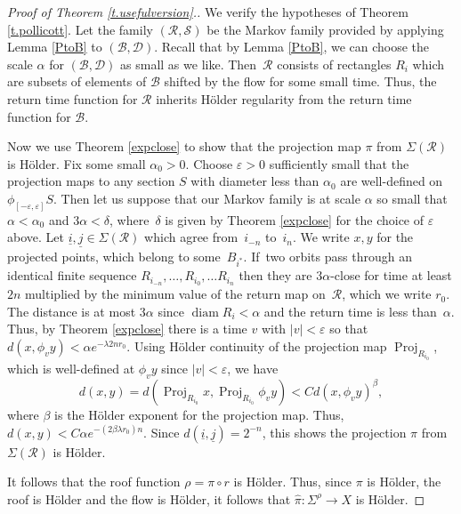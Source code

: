 \documentclass[11pt]{article}
\let\mathcal\mathscr
\let\epsilon\varepsilon
\theoremstyle{definition}
\numberwithin{equation}{section}
\DeclareMathOperator{\diam}{diam}
\DeclareMathOperator{\Proj}{Proj}
\newcommand\DDD{\mathcal D}
\newcommand\BBB{\mathcal B}
\newcommand\RRR{\mathcal R}
\newcommand\SSS{\mathcal S}
\begin{document}
\begin{proof}[Proof of Theorem \ref{t.usefulversion}.]

We verify the hypotheses of Theorem \ref{t.pollicott}. Let the family $(\RRR, \SSS)$ be the Markov family provided by applying Lemma \ref{PtoB} to $(\BBB, \DDD)$. Recall that by Lemma \ref{PtoB}, we can choose the scale $\alpha$ for $(\BBB, \DDD)$ as small as we like. Then~$\RRR$ consists of rectangles $R_i$ which are subsets of elements of $\BBB$ shifted by the flow for some small time. Thus, the return time function for $\RRR$ inherits Hölder regularity from the return time function for $\BBB$.

Now we use Theorem \ref{expclose} to show that the projection map $\pi$ from $\Sigma(\RRR)$ is Hölder. Fix some small $\alpha_0>0$. Choose $\epsilon>0$ sufficiently small that the projection maps to any section $S$ with diameter less than $\alpha_0$ are well-defined on $\phi_{[-\epsilon,\epsilon]}S$. Then let us suppose that our Markov family is at scale $\alpha$ so small that $\alpha<\alpha_0$ and $3\alpha < \delta$, where~$\delta$ is given by Theorem \ref{expclose} for the choice of $\epsilon$ above. Let $\underline i, \underline j \in \Sigma(\RRR)$ which agree from~$i_{-n}$ to~$i_n$. We write $x, y$ for the projected points, which belong to some~$B_{i^*}$. If~two orbits pass through an identical finite sequence $R_{i_{-n}}, \ldots, R_{i_0}, \ldots R_{i_n}$ then they are $3\alpha$-close for time at least $2n$ multiplied by the minimum value of the return map on~$\RRR$, which we write $r_0$. The distance is at most $3 \alpha$ since $\diam R_i < \alpha$ and the return time is less than~$\alpha$. Thus, by Theorem \ref{expclose} there is a time $v$ with $|v|<\epsilon$ so that $d(x, \phi_v y)< \alpha e^{-\lambda 2nr_0}$. Using Hölder continuity of the projection map $\Proj_{R_{i_0}}$, which is well-defined at $\phi_vy$ since $|v|<\epsilon$, we have
\[
d(x,y) = d(\Proj_{R_{i_0}}x, \Proj_{R_{i_0}}\phi_v y)< Cd(x, \phi_vy)^\beta,
\]
where $\beta$ is the Hölder exponent for the projection map. Thus, $d(x,y) < C\alpha e^{-(2\beta \lambda r_0) n}$. Since $d(\underline i, \underline j) = 2^{-n}$, this shows the projection $\pi$ from $\Sigma(\RRR)$ is Hölder.

It follows that the roof function $\rho = \pi \circ r$ is Hölder. Thus, since $\pi$ is Hölder, the roof is Hölder and the flow is Hölder, it follows that $\hat \pi: \Sigma^\rho \to X$ is Hölder.
\end{proof}
\end{document}
